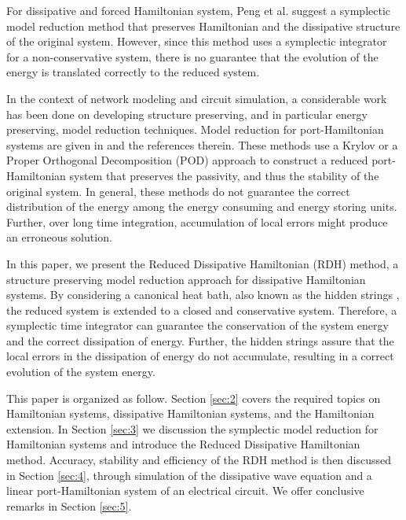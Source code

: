 For dissipative and forced Hamiltonian system, Peng et al. \cite{peng2016geometric} suggest a symplectic model reduction method that preserves Hamiltonian and the dissipative structure of the original system. However, since this method uses a symplectic integrator for a non-conservative system, there is no guarantee that the evolution of the energy is translated correctly to the reduced system.

In the context of network modeling and circuit simulation, a considerable work has been done on developing structure preserving, and in particular energy preserving, model reduction techniques. Model reduction for port-Hamiltonian systems are given in \cite{Polyuga:2010gj,beattie2011structure,chaturantabut2016structure} and the references therein. These methods use a Krylov or a Proper Orthogonal Decomposition (POD) approach to construct a reduced port-Hamiltonian system that preserves the passivity, and thus the stability of the original system. In general, these methods do not guarantee the correct distribution of the energy among the energy consuming and energy storing units. Further, over long time integration, accumulation of local errors might produce an erroneous solution.

In this paper, we present the Reduced Dissipative Hamiltonian (RDH) method, a structure preserving model reduction approach for dissipative Hamiltonian systems. By considering a canonical heat bath, also known as the hidden strings \cite{Figotin:2006jy,Figotin:2005}, the reduced system is extended to a closed and conservative system. Therefore, a symplectic time integrator can guarantee the conservation of the system energy and the correct dissipation of energy. Further, the hidden strings assure that the local errors in the dissipation of energy do not accumulate, resulting in a correct evolution of the system energy.

This paper is organized as follow. Section \ref{sec:2} covers the required topics on Hamiltonian systems, dissipative Hamiltonian systems, and the Hamiltonian extension. In Section \ref{sec:3} we discussion the symplectic model reduction for Hamiltonian systems and introduce the Reduced Dissipative Hamiltonian method. Accuracy, stability and efficiency of the RDH method is then discussed in Section \ref{sec:4}, through simulation of the dissipative wave equation and a linear port-Hamiltonian system of an electrical circuit. We offer conclusive remarks in Section \ref{sec:5}.
